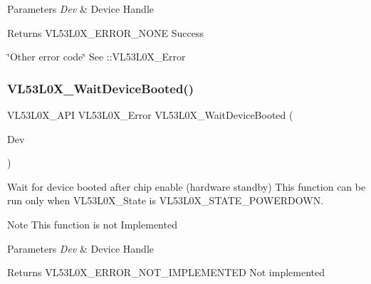 \begin{DoxyParams}{Parameters}
{\em Dev} & Device Handle \\
\hline
\end{DoxyParams}
\begin{DoxyReturn}{Returns}
V\+L53\+L0\+X\+\_\+\+E\+R\+R\+O\+R\+\_\+\+N\+O\+NE Success 

\char`\"{}\+Other error code\char`\"{} See \+::\+V\+L53\+L0\+X\+\_\+\+Error 
\end{DoxyReturn}
\mbox{\label{group__VL53L0X__init__group_ga079f2bafbcb26cb4ccf897bb835fcdc8}} 
\subsubsection{\texorpdfstring{V\+L53\+L0\+X\+\_\+\+Wait\+Device\+Booted()}{VL53L0X\_WaitDeviceBooted()}}
{\footnotesize\ttfamily V\+L53\+L0\+X\+\_\+\+A\+PI V\+L53\+L0\+X\+\_\+\+Error V\+L53\+L0\+X\+\_\+\+Wait\+Device\+Booted (\begin{DoxyParamCaption}\item[{\hyperlink{group__VL53L0X__platform__group_ga2d6405308b1dd524b462f1b8fb97d167}{V\+L53\+L0\+X\+\_\+\+D\+EV}}]{Dev }\end{DoxyParamCaption})}



Wait for device booted after chip enable (hardware standby) This function can be run only when V\+L53\+L0\+X\+\_\+\+State is V\+L53\+L0\+X\+\_\+\+S\+T\+A\+T\+E\+\_\+\+P\+O\+W\+E\+R\+D\+O\+WN. 

\begin{DoxyNote}{Note}
This function is not Implemented
\end{DoxyNote}

\begin{DoxyParams}{Parameters}
{\em Dev} & Device Handle \\
\hline
\end{DoxyParams}
\begin{DoxyReturn}{Returns}
V\+L53\+L0\+X\+\_\+\+E\+R\+R\+O\+R\+\_\+\+N\+O\+T\+\_\+\+I\+M\+P\+L\+E\+M\+E\+N\+T\+ED Not implemented 
\end{DoxyReturn}
